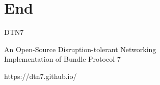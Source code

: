 \section{End}

\begin{frame}
\begin{center}
  \Large{DTN7}

  \large{An Open-Source Disruption-tolerant Networking \\ Implementation of Bundle Protocol 7}
\end{center}

\begin{center}
  \Large{https://dtn7.github.io/}
\end{center}
\end{frame}
